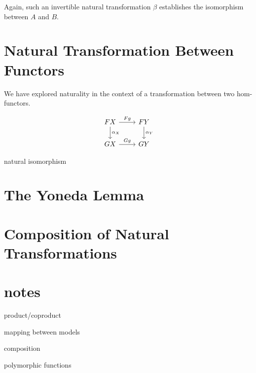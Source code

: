 \documentclass[DaoFP]{subfiles}
\begin{document}
Again, such an invertible natural transformation $\beta$ establishes the isomorphism between $A$ and $B$.

\section{Natural Transformation Between Functors}

We have explored naturality in the context of a transformation between two hom-functors. 

\[
 \begin{tikzcd}
 F X
 \arrow[d, "\alpha_X"]
 \arrow[r, "F g"]
 &
F Y
  \arrow[d, "\alpha_Y"]
 \\
G X
 \arrow[r, "G g"]
& G Y
 \end{tikzcd}
\]


natural isomorphism

\section{The Yoneda Lemma}

\section{Composition of Natural Transformations}

\section{notes}

product/coproduct

mapping between models

composition

polymorphic functions

\begin{exercise}
\end{exercise}
\begin{haskell}
\end{haskell}
\[
 \begin{tikzcd}
  \end{tikzcd}
\]
\end{document}
